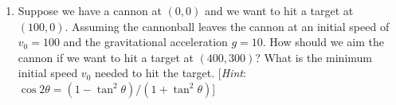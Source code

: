 \documentclass{article}
\begin{document}
\begin{enumerate}
\begin{figure}[h]
\end{figure}

\item  Suppose we have a cannon at $(0,0)$ and we want to hit a target at $(100,0)$. Assuming the cannonball leaves the cannon at an initial speed of $v_0=100$ and the gravitational acceleration $g = 10$. How should we aim the cannon if we want to hit a target at $(400,300)$? What is the minimum initial speed $v_0$ needed to hit the target. [{\it Hint}: $\cos 2\theta = (1-\tan^2\theta)/(1+\tan^2\theta)$]



\end{enumerate}
\end{document}
